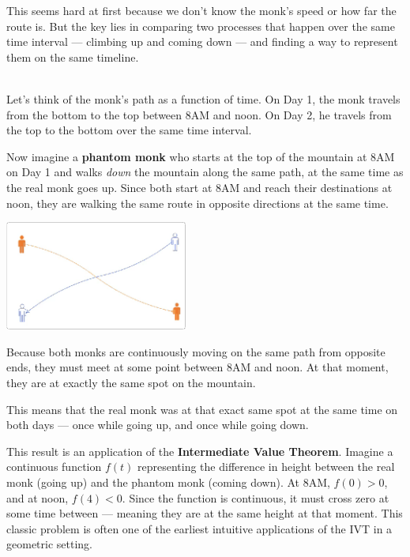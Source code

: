 \documentclass{article}
\begin{document}
\begin{analysis*}
    This seems hard at first because we don't know the monk’s speed or how far the route is. But the key lies in comparing two processes that happen over the same time interval — climbing up and coming down — and finding a way to represent them on the same timeline.
\end{analysis*}

\begin{soln}\ \\\indent
    Let's think of the monk's path as a function of time. On Day 1, the monk travels from the bottom to the top between 8AM and noon. On Day 2, he travels from the top to the bottom over the same time interval.

    Now imagine a \textbf{phantom monk} who starts at the top of the mountain at 8AM on Day 1 and walks \emph{down} the mountain along the same path, at the same time as the real monk goes up. Since both start at 8AM and reach their destinations at noon, they are walking the same route in opposite directions at the same time.

    \begin{center}
        \includegraphics[width=6cm]{./png/2-monks.png}
    \end{center}

    Because both monks are continuously moving on the same path from opposite ends, they must meet at some point between 8AM and noon. At that moment, they are at exactly the same spot on the mountain.

    This means that the real monk was at that exact same spot at the same time on both days — once while going up, and once while going down.
\end{soln}

\begin{remark*}
    This result is an application of the \textbf{Intermediate Value Theorem}. Imagine a continuous function \( f(t) \) representing the difference in height between the real monk (going up) and the phantom monk (coming down). At 8AM, \( f(0) > 0 \), and at noon, \( f(4) < 0 \). Since the function is continuous, it must cross zero at some time between — meaning they are at the same height at that moment. This classic problem is often one of the earliest intuitive applications of the IVT in a geometric setting.
\end{remark*}
\end{document}
